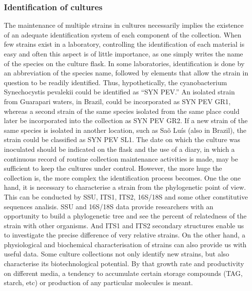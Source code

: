 \subsubsection{Identification of cultures}
The maintenance of multiple strains in cultures necessarily implies the existence of an adequate identification system of each component of the collection. When few strains exist in a laboratory, controlling the identification of each material is easy and often this aspect is of little importance, as one simply writes the name of the species on the culture flask. In some laboratories, identification is done by an abbreviation of the species name, followed by elements that allow the strain in question to be readily identified. Thus, hypothetically, the cyanobacterium Synechocystis pevalekii could be identified as “SYN PEV.” An isolated strain from Guarapari waters, in Brazil, could be incorporated as SYN PEV GR1, whereas a second strain of the same species isolated from the same place could later be incorporated into the collection as SYN PEV GR2. If a new strain of the same species is isolated in another location, such as Sa\~{o} Lu\'{i}s (also in Brazil), the strain could be classified as SYN PEV SL1. The date on which the culture was inoculated should be indicated on the flask and the use of a diary, in which a continuous record of routine collection maintenance activities is made, may be sufficient to keep the cultures under control. However, the more huge the collection is, the more complex the identification process becomes. 
\newline\newline
One the one hand, it is necessary to characterise a strain from the phylogenetic point of view. This can be conducted by SSU, ITS1, ITS2, 16S/18S and some other constitutive sequences analisis. SSU and 16S/18S data provide researchers with an opportunity to build a phylogenetic tree and see the percent of relatedness of the strain with other organisms. And ITS1 and ITS2 secondary structures enable us to investigate the precise difference of very relative strains. 
\newline\newline
On the other hand, a physiological and biochemical characterisation of strains can also provide us with useful data. Some culture collections not only identify new strains, but also characterise its biotechnological potential. By that growth rate and productivity on different media, a tendency to accumulate certain storage compounds (TAG, starch, etc) or production of any particular molecules is meant. 


